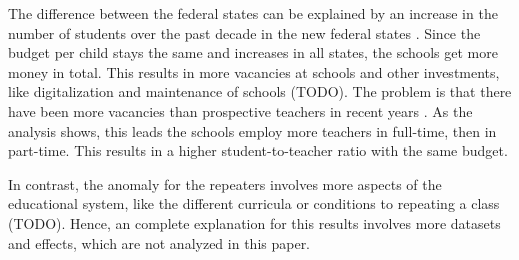 The difference between the federal states can be explained by an increase in the number of students over the past decade in the new federal states \cite{thuringer_ministerium_fur_bildung_jugend_und_sport_verteilung_2023, brandenburger_ministerium_fur_bildung_jugend_und_sport_zahlen_2023,statistisches_amt_mecklenburg-vorpommern_statistik_nodate}. Since the budget per child stays the same and increases in all states, the schools get more money in total. This results in more vacancies at schools and other investments, like digitalization and maintenance of schools (TODO). The problem is that there have been more vacancies than prospective teachers in recent years \cite{kultusminister_konferenz_lehrkrafteeinstellungsbedarf_2023}. As the analysis shows, this leads the schools employ more teachers in full-time, then in part-time. This results in a higher student-to-teacher ratio with the same budget.

In contrast, the anomaly for the repeaters involves more aspects of the educational system, like the different curricula or conditions to repeating a class (TODO). Hence, an complete explanation for this results involves more datasets and effects, which are not analyzed in this paper.
